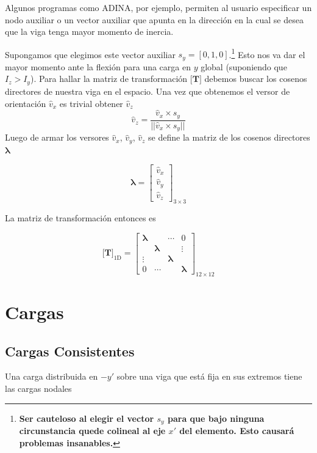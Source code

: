 \documentclass[11pt, a4paper,titlepage]{article}
\newcommand{\Adina}{{\sc ADINA}}
\newcommand{\Mme}[1]{\boldsymbol{[}\mathbf{#1} \boldsymbol{]}}
\newcommand{\feaPP}{null.tex}
\begin{document}
Algunos programas como \Adina, por ejemplo, permiten al usuario especificar un nodo auxiliar o un vector auxiliar que apunta en la dirección en la cual se desea que la viga tenga mayor momento de inercia. 

Supongamos que elegimos este vector auxiliar $s_y=[0,1,0]$.\footnote{\textbf{Ser cauteloso al elegir el vector $s_y$ para que bajo ninguna circunstancia quede colineal al eje $x'$ del elemento. Esto causará problemas insanables.}} Esto nos va dar el mayor momento ante la flexión para una carga en $y$ global (suponiendo que $I_z>I_y$).
 \newcommand{\versor}[1]{\hat{#1}}
Para hallar la matriz de transformación $\Mme{T}$ debemos buscar los cosenos directores de nuestra viga en el espacio. Una vez que obtenemos el versor de orientación $\versor{v}_x$ es trivial obtener $\versor{v}_z$
\[
\versor{v}_z = \frac{\versor{v}_x\times s_y}{||\versor{v}_x\times s_y||}
\]
Luego de armar los versores $\versor{v}_x$, $\versor{v}_y$, $\versor{v}_z$ se define la matriz de los cosenos directores $\pmb{\lambda}$

\[
\pmb{\lambda} = \begin{bmatrix}
\versor{v}_x \\
\versor{v}_y \\
\versor{v}_z 
\end{bmatrix}_{3\times3}
\]

La matriz de transformación entonces es

\begin{equation}
	\Mme{T}_{\mathrm{1D}}=\begin{bmatrix}
	\pmb{\lambda} & &\cdots & 0 \\
	 &\pmb{\lambda} &  &\vdots \\
	\vdots & &\pmb{\lambda} & \\
	0 &\cdots & & \pmb{\lambda}
	\end{bmatrix}_{12\times 12}
\end{equation}


\section{Cargas}
\subsection{Cargas Consistentes}
Una carga distribuida en $-y'$ sobre una viga que está fija en sus extremos tiene las cargas nodales
\end{document}
